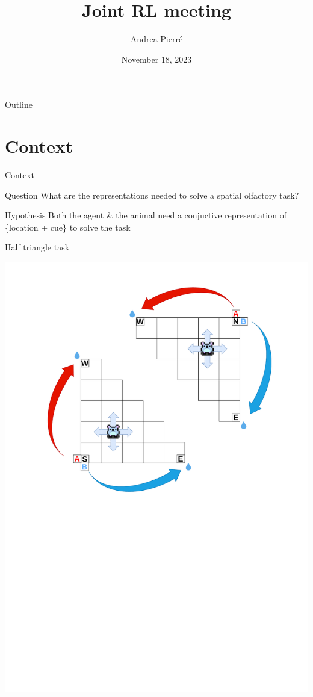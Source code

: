 \documentclass[bigger]{beamer}
\author{Andrea Pierré}
\date{November 18, 2023}
\title{Joint RL meeting}
\institute{Brown University}
\begin{document}
\maketitle
\begin{frame}[plain]{Outline}
\tableofcontents
\end{frame}

\section{Context}
\label{sec:org6bf6393}
\begin{frame}[label={sec:org043f73c}]{Context}
\begin{exampleblock}{Question}
    What are the representations needed to solve a spatial olfactory task?
\end{exampleblock}
\vspace{2em}
\begin{exampleblock}{Hypothesis}
    Both the agent \& the animal need a conjuctive representation of \{location + cue\} to solve the task
\end{exampleblock}
\end{frame}
\begin{frame}[label={sec:org8cae1a4}]{Half triangle task}
\begin{center}
\includegraphics[width=.9\linewidth]{img/RL_env-triangle-task.drawio.pdf}
\end{center}
\end{frame}
\end{document}
